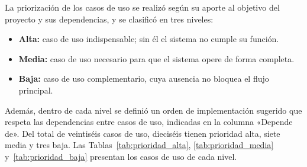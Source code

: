 \label{sec:cap5_priorizacion_cu}

La priorización de los casos de uso se realizó según su aporte al objetivo del proyecto y sus dependencias, y se clasificó en tres niveles:

\begin{itemize}
    \item \textbf{Alta:} caso de uso indispensable; sin él el sistema no cumple su función.
    \item \textbf{Media:} caso de uso necesario para que el sistema opere de forma completa.
    \item \textbf{Baja:} caso de uso complementario, cuya ausencia no bloquea el flujo principal.
\end{itemize}

Además, dentro de cada nivel se definió un orden de implementación sugerido que respeta las dependencias entre casos de uso, indicadas en la columna «Depende de». Del total de veintiséis casos de uso, dieciséis tienen prioridad alta, siete media y tres baja. Las Tablas~\ref{tab:prioridad_alta}, \ref{tab:prioridad_media} y~\ref{tab:prioridad_baja} presentan los casos de uso de cada nivel.

